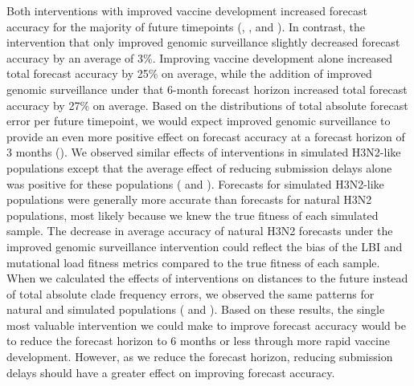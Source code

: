 \documentclass[9pt,lineno]{elife}
\begin{document}
Both interventions with improved vaccine development increased forecast accuracy for the majority of future timepoints (, , and ).
In contrast, the intervention that only improved genomic surveillance slightly decreased forecast accuracy by an average of 3\%.
Improving vaccine development alone increased total forecast accuracy by 25\% on average, while the addition of improved genomic surveillance under that 6-month forecast horizon increased total forecast accuracy by 27\% on average.
Based on the distributions of total absolute forecast error per future timepoint, we would expect improved genomic surveillance to provide an even more positive effect on forecast accuracy at a forecast horizon of 3 months ().
We observed similar effects of interventions in simulated H3N2-like populations except that the average effect of reducing submission delays alone was positive for these populations ( and ).
Forecasts for simulated H3N2-like populations were generally more accurate than forecasts for natural H3N2 populations, most likely because we knew the true fitness of each simulated sample.
The decrease in average accuracy of natural H3N2 forecasts under the improved genomic surveillance intervention could reflect the bias of the LBI and mutational load fitness metrics compared to the true fitness of each sample.
When we calculated the effects of interventions on distances to the future instead of total absolute clade frequency errors, we observed the same patterns for natural and simulated populations ( and ).
Based on these results, the single most valuable intervention we could make to improve forecast accuracy would be to reduce the forecast horizon to 6 months or less through more rapid vaccine development.
However, as we reduce the forecast horizon, reducing submission delays should have a greater effect on improving forecast accuracy.
\end{document}
